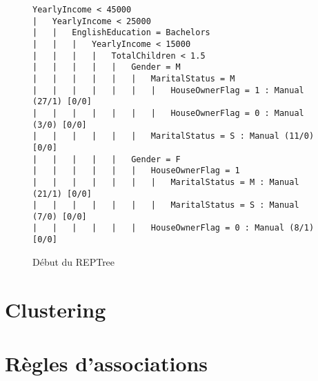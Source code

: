 \begin{figure}[H]
\centering
\begin{lstlisting}	
YearlyIncome < 45000
|   YearlyIncome < 25000
|   |   EnglishEducation = Bachelors
|   |   |   YearlyIncome < 15000
|   |   |   |   TotalChildren < 1.5
|   |   |   |   |   Gender = M
|   |   |   |   |   |   MaritalStatus = M
|   |   |   |   |   |   |   HouseOwnerFlag = 1 : Manual (27/1) [0/0]
|   |   |   |   |   |   |   HouseOwnerFlag = 0 : Manual (3/0) [0/0]
|   |   |   |   |   |   MaritalStatus = S : Manual (11/0) [0/0]
|   |   |   |   |   Gender = F
|   |   |   |   |   |   HouseOwnerFlag = 1
|   |   |   |   |   |   |   MaritalStatus = M : Manual (21/1) [0/0]
|   |   |   |   |   |   |   MaritalStatus = S : Manual (7/0) [0/0]
|   |   |   |   |   |   HouseOwnerFlag = 0 : Manual (8/1) [0/0]
\end{lstlisting}
\caption{Début du REPTree}
\label{lst:reptree_sample}
\end{figure}


\section{Clustering}


\section{Règles d'associations}

